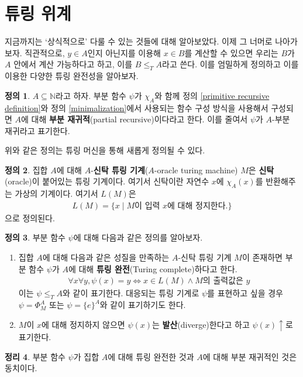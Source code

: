 \documentclass[b5paper, 11pt]{book}
\theoremstyle{definition}
\newtheorem{defn}{정의}[chapter]
\newtheorem{thm}[defn]{정리}
\begin{document}
\section{튜링 위계}
지금까지는 `상식적으로' 다룰 수 있는 것들에 대해 알아보았다. 이제 그 너머로 나아가보자.
직관적으로, $y \in A$인지 아닌지를 이용해 $x \in B$를 계산할 수 있으면 우리는 $B$가 $A$ 안에서 계산 가능하다고 하고, 이를 $B \le_T A$라고 쓴다. 이를 엄밀하게 정의하고 이를 이용한 다양한 튜링 완전성을 알아보자.
\begin{defn}
    $A \subseteq \mathbb{N}$라고 하자. 부분 함수 $\psi$가 
    $\chi_A$와 함께 정의 \ref{primitive recursive definition}와 정의 \ref{minimalization}에서 사용되는 함수 구성 방식을 사용해서 구성되면 $A$에 대해 \textbf{부분 재귀적}(partial recursive)이다라고 한다. 이를 줄여서 $\psi$가 $A$-부분 재귀라고 표기한다.
\end{defn}
위와 같은 정의는 튜링 머신을 통해 새롭게 정의될 수 있다.
\begin{defn}
    집합 $A$에 대해 $A$-\textbf{신탁 튜링 기계}($A$-oracle turing machine) $M$은 \textbf{신탁}(oracle)이 붙어있는 튜링 기계이다. 여기서 신탁이란 자연수 $x$에 $\chi_A(x)$를 반환해주는 가상의 기계이다. 여기서 $L(M)$은 
    \begin{align*}
        L(M) = \{x \;\vert\; M\text{이 입력 } x\text{에 대해 정지한다.} \}
    \end{align*}
    으로 정의된다.
\end{defn}
\begin{defn}
    부분 함수 $\psi$에 대해 다음과 같은 정의를 알아보자.
    \begin{enumerate}
        \item 집합 $A$에 대해 다음과 같은 성질을 만족하는 $A$-신탁 튜링 기계 $M$이 존재하면 부분 함수 $\psi$가 $A$에 대해 \textbf{튜링 완전}(Turing complete)하다고 한다.
        \begin{align*}
            \forall x \forall y,  \psi(x) = y \Leftrightarrow 
            x \in L(M) \wedge M\text{의 출력값은 } y
        \end{align*} 
        이는 $\psi \le_T A$와 같이 표기한다. 대응되는 튜링 기계로 $\psi$를 표현하고 싶을 경우 $\psi = \Phi_M^A$ 또는 $\psi = \{e\}^A$와 같이 표기하기도 한다. 
        \item $M$이 $x$에 대해 정지하지 않으면 $\psi(x)$는 \textbf{발산}(diverge)한다고 하고
        $\psi(x) \uparrow$로 표기한다.
    \end{enumerate}
\end{defn}
\begin{thm}
    부분 함수 $\psi$가 집합 $A$에 대해 튜링 완전한 것과 $A$에 대해 부분 재귀적인 것은 동치이다.
\end{thm}
\end{document}
